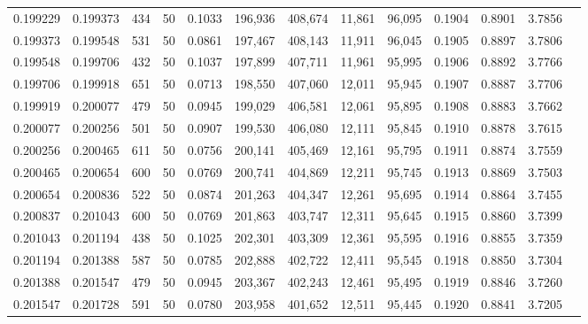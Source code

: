 \begin{tabular}{rrrrrrrrrrrrr}
0.199229 & 0.199373 &   434 &  50 &                                     0.1033 & 196,936 & 408,674 &  11,861 &  96,095 & 0.1904 & 0.8901 & 3.7856 \\
0.199373 & 0.199548 &   531 &  50 &                                     0.0861 & 197,467 & 408,143 &  11,911 &  96,045 & 0.1905 & 0.8897 & 3.7806 \\
0.199548 & 0.199706 &   432 &  50 &                                     0.1037 & 197,899 & 407,711 &  11,961 &  95,995 & 0.1906 & 0.8892 & 3.7766 \\
0.199706 & 0.199918 &   651 &  50 &                                     0.0713 & 198,550 & 407,060 &  12,011 &  95,945 & 0.1907 & 0.8887 & 3.7706 \\
0.199919 & 0.200077 &   479 &  50 &                                     0.0945 & 199,029 & 406,581 &  12,061 &  95,895 & 0.1908 & 0.8883 & 3.7662 \\
0.200077 & 0.200256 &   501 &  50 &                                     0.0907 & 199,530 & 406,080 &  12,111 &  95,845 & 0.1910 & 0.8878 & 3.7615 \\
0.200256 & 0.200465 &   611 &  50 &                                     0.0756 & 200,141 & 405,469 &  12,161 &  95,795 & 0.1911 & 0.8874 & 3.7559 \\
0.200465 & 0.200654 &   600 &  50 &                                     0.0769 & 200,741 & 404,869 &  12,211 &  95,745 & 0.1913 & 0.8869 & 3.7503 \\
0.200654 & 0.200836 &   522 &  50 &                                     0.0874 & 201,263 & 404,347 &  12,261 &  95,695 & 0.1914 & 0.8864 & 3.7455 \\
0.200837 & 0.201043 &   600 &  50 &                                     0.0769 & 201,863 & 403,747 &  12,311 &  95,645 & 0.1915 & 0.8860 & 3.7399 \\
0.201043 & 0.201194 &   438 &  50 &                                     0.1025 & 202,301 & 403,309 &  12,361 &  95,595 & 0.1916 & 0.8855 & 3.7359 \\
0.201194 & 0.201388 &   587 &  50 &                                     0.0785 & 202,888 & 402,722 &  12,411 &  95,545 & 0.1918 & 0.8850 & 3.7304 \\
0.201388 & 0.201547 &   479 &  50 &                                     0.0945 & 203,367 & 402,243 &  12,461 &  95,495 & 0.1919 & 0.8846 & 3.7260 \\
0.201547 & 0.201728 &   591 &  50 &                                     0.0780 & 203,958 & 401,652 &  12,511 &  95,445 & 0.1920 & 0.8841 & 3.7205 \\

\end{tabular}
